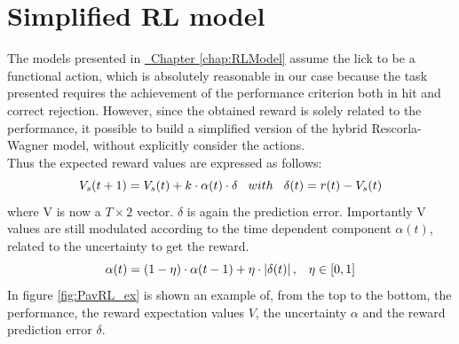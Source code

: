 \chapter{Simplified RL model}
The models presented in \hyperref[chap:RLModel]{~Chapter \ref*{chap:RLModel}} assume the lick to be a functional action, which is absolutely reasonable in our case because the task presented requires the achievement of the performance criterion both in hit and correct rejection. However, since the obtained reward is solely related to the performance, it possible to build a simplified version of the hybrid Rescorla-Wagner model, without explicitly consider the actions.\\Thus the expected reward values are expressed as follows:
\begin{equation}
V_s(t+1)=V_s(t)+k\cdot\alpha(t)\cdot\delta  \hspace{0.3cm} with \hspace{0.3cm}\delta(t)=r(t)-V_s(t)
\label{VValues}
\end{equation}
where V is now a $
T\times 2$ vector. $\delta$ is again the prediction error. Importantly V values are still modulated according to the time dependent component $\alpha(t)$, related to the uncertainty to get the reward.
\begin{equation}
    \alpha(t)=(1-\eta)\cdot\alpha(t-1)+\eta\cdot\left\lvert\delta(t)\right\rvert,\hspace{0.3cm} \eta\in[0,1]
\end{equation}
In figure \ref{fig:PavRL_ex} is shown an example of, from the top to the bottom, the performance, the reward expectation values $V$, the uncertainty $\alpha$ and the reward prediction error $\delta$.
